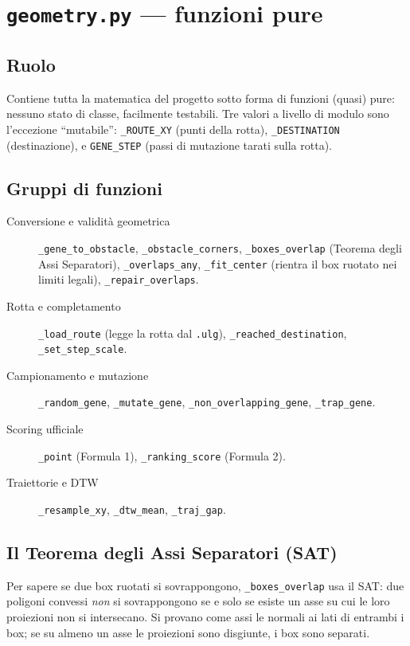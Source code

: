 \documentclass[11pt,a4paper]{report}
\newcommand{\code}[1]{\texttt{#1}}
\begin{document}
\section{\texttt{geometry.py} --- funzioni pure}
\label{sec:geometry}

\subsection{Ruolo}
Contiene tutta la matematica del progetto sotto forma di funzioni
(quasi) pure: nessuno stato di classe, facilmente testabili. Tre valori
a livello di modulo sono l'eccezione ``mutabile'': \code{\_ROUTE\_XY}
(punti della rotta), \code{\_DESTINATION} (destinazione), e
\code{GENE\_STEP} (passi di mutazione tarati sulla rotta).

\subsection{Gruppi di funzioni}
\begin{description}
  \item[Conversione e validità geometrica]
    \code{\_gene\_to\_obstacle}, \code{\_obstacle\_corners},
    \code{\_boxes\_overlap} (Teorema degli Assi Separatori),
    \code{\_overlaps\_any}, \code{\_fit\_center} (rientra il box ruotato
    nei limiti legali), \code{\_repair\_overlaps}.
  \item[Rotta e completamento]
    \code{\_load\_route} (legge la rotta dal \code{.ulg}),
    \code{\_reached\_destination}, \code{\_set\_step\_scale}.
  \item[Campionamento e mutazione]
    \code{\_random\_gene}, \code{\_mutate\_gene},
    \code{\_non\_overlapping\_gene}, \code{\_trap\_gene}.
  \item[Scoring ufficiale]
    \code{\_point} (Formula 1), \code{\_ranking\_score} (Formula 2).
  \item[Traiettorie e DTW]
    \code{\_resample\_xy}, \code{\_dtw\_mean}, \code{\_traj\_gap}.
\end{description}

\subsection{Il Teorema degli Assi Separatori (SAT)}
Per sapere se due box ruotati si sovrappongono, \code{\_boxes\_overlap}
usa il SAT: due poligoni convessi \emph{non} si sovrappongono se e solo
se esiste un asse su cui le loro proiezioni non si intersecano. Si
provano come assi le normali ai lati di entrambi i box; se su almeno un
asse le proiezioni sono disgiunte, i box sono separati.
\end{document}
